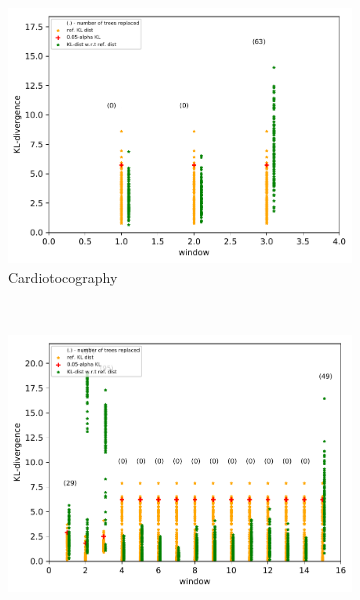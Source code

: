 \documentclass{article} %
\begin{document}
\begin{figure}
\begin{subfigure}[b]{0.23\textwidth}
	\end{subfigure}
	~ %
	\begin{subfigure}[b]{0.23\textwidth}
		\includegraphics[width=\textwidth]{figures/test_concept_drift_cardiotocography_1}
		\caption{Cardiotocography}
		\label{fig:test_concept_drift_cardiotocography}
	\end{subfigure}
    ~ %
    \begin{subfigure}[b]{0.23\textwidth}
    	\includegraphics[width=\textwidth]{figures/test_concept_drift_kddcup}

\end{subfigure}
\end{figure}
\end{document}
